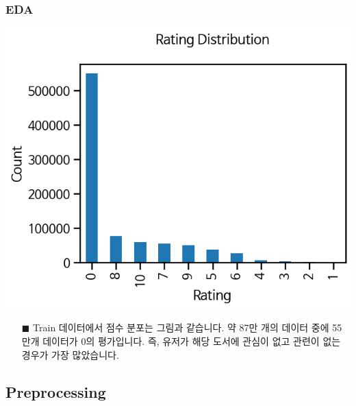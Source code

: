 \documentclass{beamer}
\begin{document}

\begin{frame}
\frametitle{EDA}

\centering
\includegraphics[scale=0.46]{rating distribution.png}

\begin{itemize}
\item[$\blacksquare$] {\footnotesize Train 데이터에서 점수 분포는 그림과 같습니다. 약 87만 개의 데이터 중에 55만개 데이터가 0의 평가입니다. 즉, 유저가 해당 도서에 관심이 없고 관련이 없는 경우가 가장 많았습니다.} 

\end{itemize}
\end{frame}

\subsection{Preprocessing}
\end{document}
